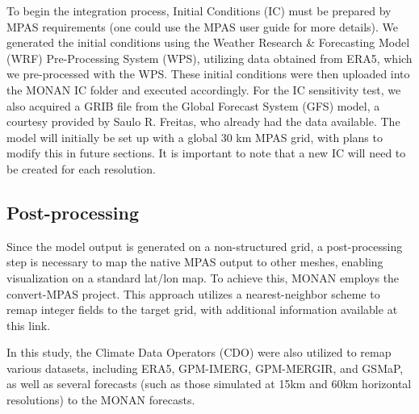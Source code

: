 To begin the integration process, Initial Conditions (IC) must be prepared by MPAS requirements (one could use the MPAS user guide for more details). We generated the initial conditions using the Weather Research \& Forecasting Model (WRF) Pre-Processing System (WPS), utilizing data obtained from ERA5, which we pre-processed with the WPS. These initial conditions were then uploaded into the MONAN IC folder and executed accordingly. For the IC sensitivity test, we also acquired a GRIB file from the Global Forecast System (GFS) model, a courtesy provided by Saulo R. Freitas, who already had the data available. The model will initially be set up with a global 30 km MPAS grid, with plans to modify this in future sections. It is important to note that a new IC will need to be created for each resolution.

\subsection{Post-processing}

Since the model output is generated on a non-structured grid, a post-processing step is necessary to map the native MPAS output to other meshes, enabling visualization on a standard lat/lon map. To achieve this, MONAN employs the convert-MPAS project. This approach utilizes a nearest-neighbor scheme to remap integer fields to the target grid, with additional information available at this link.

In this study, the Climate Data Operators (CDO) were also utilized to remap various datasets, including ERA5, GPM-IMERG, GPM-MERGIR, and GSMaP, as well as several forecasts (such as those simulated at 15km and 60km horizontal resolutions) to the MONAN forecasts.
